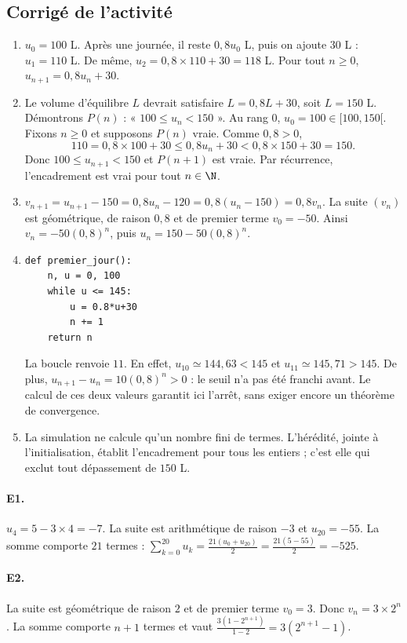\subsection{Corrigé de l'activité}\begin{enumerate}
\item $u_0=100$ L. Après une journée, il reste $0{,}8u_0$ L, puis on ajoute $30$ L : $u_1=110$ L. De même, $u_2=0{,}8\times110+30=118$ L. Pour tout $n\ge0$, $u_{n+1}=0{,}8u_n+30$.
\item Le volume d'équilibre $L$ devrait satisfaire $L=0{,}8L+30$, soit $L=150$ L. Démontrons $P(n)$ : « $100\le u_n<150$ ». Au rang $0$, $u_0=100\in[100,150[$. Fixons $n\ge0$ et supposons $P(n)$ vraie. Comme $0{,}8>0$,
\[110=0{,}8\times100+30\le0{,}8u_n+30<0{,}8\times150+30=150.\]
Donc $100\le u_{n+1}<150$ et $P(n+1)$ est vraie. Par récurrence, l'encadrement est vrai pour tout $n\in\N$.
\item $v_{n+1}=u_{n+1}-150=0{,}8u_n-120=0{,}8(u_n-150)=0{,}8v_n$. La suite $(v_n)$ est géométrique, de raison $0{,}8$ et de premier terme $v_0=-50$. Ainsi $v_n=-50(0{,}8)^n$, puis $u_n=150-50(0{,}8)^n$.
\item 
\begin{lstlisting}
def premier_jour():
    n, u = 0, 100
    while u <= 145:
        u = 0.8*u+30
        n += 1
    return n
\end{lstlisting}
La boucle renvoie $11$. En effet, $u_{10}\simeq144{,}63<145$ et $u_{11}\simeq145{,}71>145$. De plus, $u_{n+1}-u_n=10(0{,}8)^n>0$ : le seuil n'a pas été franchi avant. Le calcul de ces deux valeurs garantit ici l'arrêt, sans exiger encore un théorème de convergence.
\item La simulation ne calcule qu'un nombre fini de termes. L'hérédité, jointe à l'initialisation, établit l'encadrement pour tous les entiers ; c'est elle qui exclut tout dépassement de $150$ L.
\end{enumerate}

\paragraph{E1.}$u_4=5-3\times4=-7$. La suite est arithmétique de raison $-3$ et $u_{20}=-55$. La somme comporte $21$ termes : $\sum_{k=0}^{20}u_k=\frac{21(u_0+u_{20})}{2}=\frac{21(5-55)}{2}=-525$.

\paragraph{E2.}La suite est géométrique de raison $2$ et de premier terme $v_0=3$. Donc $v_n=3\times2^n$. La somme comporte $n+1$ termes et vaut $\frac{3(1-2^{n+1})}{1-2}=3(2^{n+1}-1)$.

